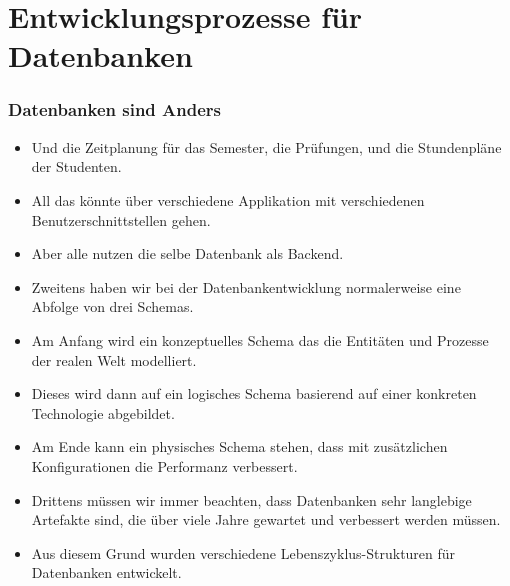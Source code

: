 \documentclass[aspectratio=169,mathserif,notheorems]{beamer}%
\begin{document}
\section{Entwicklungsprozesse für Datenbanken}%
%
\begin{frame}[t]%
\frametitle{Datenbanken sind Anders}%
\begin{itemize}%
%
%
%
%
%
%
%
%
%
%
\item<6-> Und die Zeitplanung für das Semester, die Prüfungen, und die Stundenpläne der Studenten.%
%
\item<7-> All das könnte über verschiedene Applikation mit verschiedenen Benutzerschnittstellen gehen.%
%
\item<8-> Aber alle nutzen die selbe Datenbank als Backend.%
%
\item<9-> \alert{Zweitens} haben wir bei der Datenbankentwicklung normalerweise eine Abfolge von drei Schemas.%
%
\item<10-> Am Anfang wird ein konzeptuelles Schema das die Entitäten und Prozesse der realen Welt modelliert.%
%
\item<11-> Dieses wird dann auf ein logisches Schema basierend auf einer konkreten Technologie abgebildet.%
%
\item<12-> Am Ende kann ein physisches Schema stehen, dass mit zusätzlichen Konfigurationen die Performanz verbessert.%
%
\item<13-> Drittens müssen wir immer beachten, dass Datenbanken sehr langlebige Artefakte sind, die über viele Jahre gewartet und verbessert werden müssen.%
%
\item<14-> Aus diesem Grund wurden verschiedene Lebenszyklus-Strukturen für Datenbanken entwickelt.%
\end{itemize}%
\end{frame}%
\end{document}
